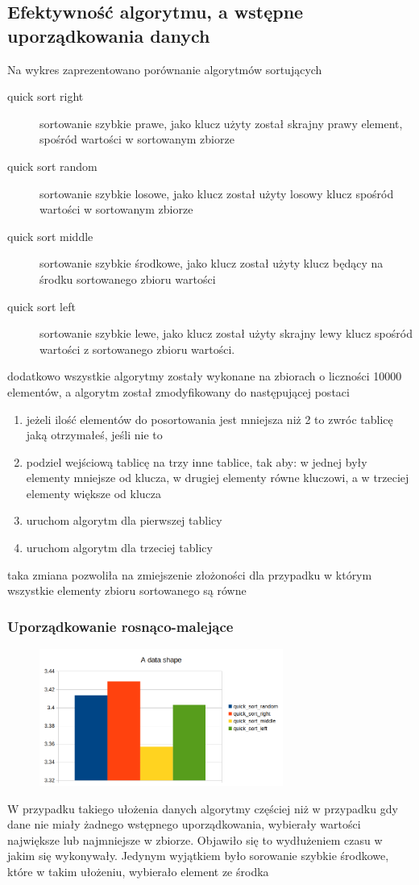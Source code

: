 \documentclass[]{article}
\begin{document}
	\subsection{Efektywność algorytmu, a wstępne uporządkowania danych}
		Na wykres zaprezentowano porównanie algorytmów sortujących
		\begin{description}
			\item[quick sort right] sortowanie szybkie prawe, jako klucz użyty został skrajny prawy element, spośród wartości w sortowanym zbiorze
			
			\item[quick sort random] sortowanie szybkie losowe, jako klucz został użyty losowy klucz spośród wartości w sortowanym zbiorze
			
			\item[quick sort middle] sortowanie szybkie środkowe, jako klucz został użyty klucz będący na środku sortowanego zbioru wartości
			
			\item[quick sort left] sortowanie szybkie lewe, jako klucz został użyty skrajny lewy klucz spośród wartości z sortowanego zbioru wartości.
		\end{description}
		dodatkowo wszystkie algorytmy zostały wykonane na zbiorach o liczności 10000 elementów, a algorytm został zmodyfikowany do następującej postaci
		\begin{enumerate}
			\item jeżeli ilość elementów do posortowania jest mniejsza niż 2 to zwróc tablicę jaką otrzymałeś, jeśli nie to
			\item podziel wejściową tablicę na trzy inne tablice, tak aby: w jednej były elementy mniejsze od klucza, w drugiej elementy równe kluczowi, a w trzeciej elementy większe od klucza
			\item uruchom algorytm dla pierwszej tablicy
			\item uruchom algorytm dla trzeciej tablicy
		\end{enumerate}
		taka zmiana pozwoliła na zmiejszenie złożoności dla przypadku w którym wszystkie elementy zbioru sortowanego są równe
		\subsubsection{Uporządkowanie rosnąco-malejące}
		\begin{figure}[H]
			\centering
			\includegraphics[width=8cm]{quick_sort_a.png}	
		\end{figure}
		W przypadku takiego ułożenia danych algorytmy częściej niż w przypadku gdy dane nie miały żadnego wstępnego uporządkowania, wybierały wartości największe lub najmniejsze w zbiorze. Objawiło się to wydłużeniem czasu w jakim się wykonywały. Jedynym wyjątkiem było sorowanie szybkie środkowe, które w takim ułożeniu, wybierało element ze środka
\end{document}
